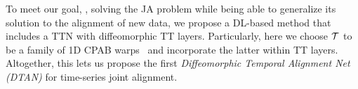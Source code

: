 To meet our goal, \ie, solving the JA problem while being able to generalize its solution to the alignment of new data, we propose a DL-based method that includes a TTN with diffeomorphic TT layers. Particularly, here we choose $\mathcal{T}$ to be a family of 1D CPAB warps~\cite{Freifeld:ICCV:2015:CPAB,Freifeld:PAMI:2017:CPAB} and incorporate the latter within TT layers. 
Altogether, this lets us propose the first \emph{Diffeomorphic Temporal Alignment Net (DTAN)} for time-series joint alignment.
